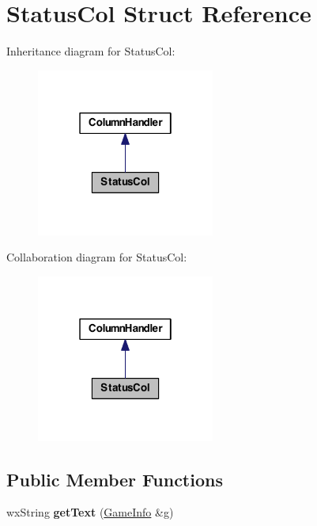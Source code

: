 \hypertarget{struct_status_col}{\section{Status\-Col Struct Reference}
\label{struct_status_col}
}


Inheritance diagram for Status\-Col\-:
\nopagebreak
\begin{figure}[H]
\begin{center}
\leavevmode
\includegraphics[width=166pt]{struct_status_col__inherit__graph}
\end{center}
\end{figure}


Collaboration diagram for Status\-Col\-:
\nopagebreak
\begin{figure}[H]
\begin{center}
\leavevmode
\includegraphics[width=166pt]{struct_status_col__coll__graph}
\end{center}
\end{figure}
\subsection*{Public Member Functions}
\begin{DoxyCompactItemize}
\item 
\hypertarget{struct_status_col_a49713fd019525a7389f66db0b17d372b}{wx\-String {\bfseries get\-Text} (\hyperlink{struct_game_info}{Game\-Info} \&g)}\label{struct_status_col_a49713fd019525a7389f66db0b17d372b}

\end{DoxyCompactItemize}
